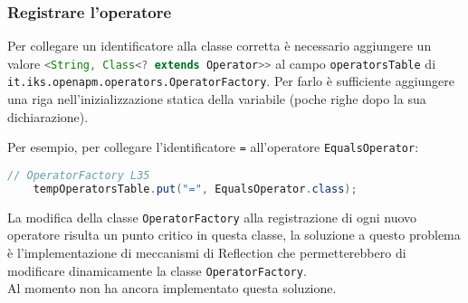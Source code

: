 	\subsubsection{Registrare l'operatore}

		Per collegare un identificatore alla classe corretta è necessario aggiungere un valore 
		\lstinline[language=Java]{<String, Class<? extends Operator>>} al campo \lstinline{operatorsTable} 
		di 	\lstinline{it.iks.openapm.operators.OperatorFactory}. 
		Per farlo è sufficiente aggiungere una riga nell'inizializzazione statica della variabile 
		(poche righe dopo la sua dichiarazione).

		Per esempio, per collegare l'identificatore \lstinline{=} all'operatore \lstinline{EqualsOperator}:
		\begin{lstlisting}[language=Java]
	// OperatorFactory L35
	tempOperatorsTable.put("=", EqualsOperator.class);
		\end{lstlisting}

		La modifica della classe \verb=OperatorFactory= alla registrazione di ogni nuovo operatore risulta un punto critico in 
		questa classe, la soluzione a questo problema è l'implementazione di meccanismi di Reflection che permetterebbero
		di modificare dinamicamente la classe \verb=OperatorFactory=.\\
		Al momento \GroupName{} non ha ancora implementato questa soluzione.
